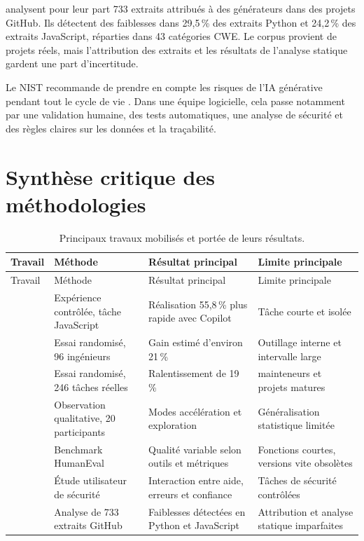 \documentclass[12pt,a4paper,oneside]{report}
\newcommand{\taux}[1]{#1\,\%}
\begin{document}
\textcite{fu2025weaknesses} analysent pour leur part 733 extraits attribués à des générateurs dans des projets GitHub. Ils détectent des faiblesses dans \taux{29,5} des extraits Python et \taux{24,2} des extraits JavaScript, réparties dans 43 catégories CWE. Le corpus provient de projets réels, mais l'attribution des extraits et les résultats de l'analyse statique gardent une part d'incertitude.

Le NIST recommande de prendre en compte les risques de l'IA générative pendant tout le cycle de vie \parencite{nist2024genai}. Dans une équipe logicielle, cela passe notamment par une validation humaine, des tests automatiques, une analyse de sécurité et des règles claires sur les données et la traçabilité.

\section{Synthèse critique des méthodologies}

\small
\begin{longtable}{@{}>{\raggedright\arraybackslash}p{2.9cm}>{\raggedright\arraybackslash}p{3.1cm}>{\raggedright\arraybackslash}p{3.5cm}>{\raggedright\arraybackslash}p{4cm}@{}}
\caption{Principaux travaux mobilisés et portée de leurs résultats.}\label{tab:literature}\\
\toprule
Travail & Méthode & Résultat principal & Limite principale \\
\midrule
\endfirsthead
\toprule
Travail & Méthode & Résultat principal & Limite principale \\
\midrule
\endhead
\textcite{peng2023productivity} & Expérience contrôlée, tâche JavaScript & Réalisation \taux{55,8} plus rapide avec Copilot & Tâche courte et isolée \\
\textcite{paradis2024enterprise} & Essai randomisé, 96 ingénieurs & Gain estimé d'environ \taux{21} & Outillage interne et intervalle large \\
\textcite{becker2025productivity} & Essai randomisé, 246 tâches réelles & Ralentissement de \taux{19} & 16 mainteneurs et projets matures \\
\textcite{barke2023grounded} & Observation qualitative, 20 participants & Modes accélération et exploration & Généralisation statistique limitée \\
\textcite{yetistiren2023quality} & Benchmark HumanEval & Qualité variable selon outils et métriques & Fonctions courtes, versions vite obsolètes \\
\textcite{perry2023insecure} & Étude utilisateur de sécurité & Interaction entre aide, erreurs et confiance & Tâches de sécurité contrôlées \\
\textcite{fu2025weaknesses} & Analyse de 733 extraits GitHub & Faiblesses détectées en Python et JavaScript & Attribution et analyse statique imparfaites \\
\bottomrule
\end{longtable}
\normalsize
\end{document}
